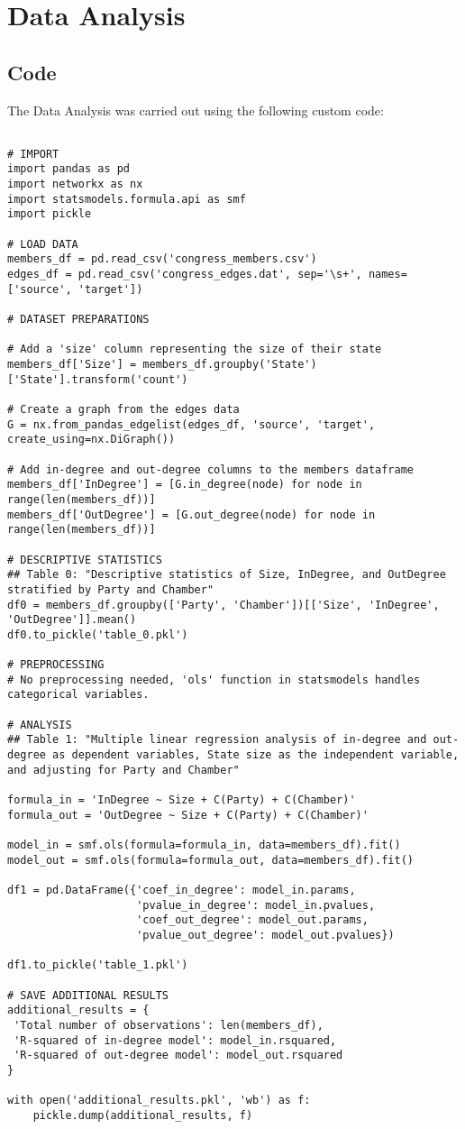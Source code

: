 \documentclass[11pt]{article}
\begin{document}
\section{Data Analysis}
\subsection{{Code}}
The Data Analysis was carried out using the following custom code:

\begin{verbatim}

# IMPORT
import pandas as pd
import networkx as nx
import statsmodels.formula.api as smf
import pickle

# LOAD DATA
members_df = pd.read_csv('congress_members.csv')
edges_df = pd.read_csv('congress_edges.dat', sep='\s+', names=['source', 'target'])

# DATASET PREPARATIONS

# Add a 'size' column representing the size of their state 
members_df['Size'] = members_df.groupby('State')['State'].transform('count')

# Create a graph from the edges data
G = nx.from_pandas_edgelist(edges_df, 'source', 'target', create_using=nx.DiGraph())

# Add in-degree and out-degree columns to the members dataframe
members_df['InDegree'] = [G.in_degree(node) for node in range(len(members_df))]
members_df['OutDegree'] = [G.out_degree(node) for node in range(len(members_df))]

# DESCRIPTIVE STATISTICS
## Table 0: "Descriptive statistics of Size, InDegree, and OutDegree stratified by Party and Chamber"
df0 = members_df.groupby(['Party', 'Chamber'])[['Size', 'InDegree', 'OutDegree']].mean()
df0.to_pickle('table_0.pkl')

# PREPROCESSING 
# No preprocessing needed, 'ols' function in statsmodels handles categorical variables.

# ANALYSIS
## Table 1: "Multiple linear regression analysis of in-degree and out-degree as dependent variables, State size as the independent variable, and adjusting for Party and Chamber"

formula_in = 'InDegree ~ Size + C(Party) + C(Chamber)'
formula_out = 'OutDegree ~ Size + C(Party) + C(Chamber)'

model_in = smf.ols(formula=formula_in, data=members_df).fit()
model_out = smf.ols(formula=formula_out, data=members_df).fit()

df1 = pd.DataFrame({'coef_in_degree': model_in.params, 
                    'pvalue_in_degree': model_in.pvalues,
                    'coef_out_degree': model_out.params, 
                    'pvalue_out_degree': model_out.pvalues})

df1.to_pickle('table_1.pkl')

# SAVE ADDITIONAL RESULTS
additional_results = {
 'Total number of observations': len(members_df),
 'R-squared of in-degree model': model_in.rsquared,
 'R-squared of out-degree model': model_out.rsquared
}

with open('additional_results.pkl', 'wb') as f:
    pickle.dump(additional_results, f)


\end{verbatim}
\end{document}
